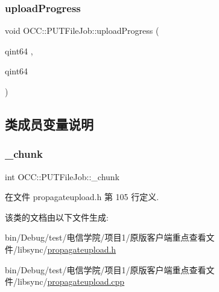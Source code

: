 \subsubsection{\texorpdfstring{upload\+Progress}{uploadProgress}}
{\footnotesize\ttfamily void O\+C\+C\+::\+P\+U\+T\+File\+Job\+::upload\+Progress (\begin{DoxyParamCaption}\item[{qint64}]{,  }\item[{qint64}]{ }\end{DoxyParamCaption})\hspace{0.3cm}{\ttfamily [signal]}}



\subsection{类成员变量说明}
\mbox{\label{class_o_c_c_1_1_p_u_t_file_job_aa10f6923befe5632249e181be64f33a7}} 
\subsubsection{\texorpdfstring{\+\_\+chunk}{\_chunk}}
{\footnotesize\ttfamily int O\+C\+C\+::\+P\+U\+T\+File\+Job\+::\+\_\+chunk}



在文件 propagateupload.\+h 第 105 行定义.



该类的文档由以下文件生成\+:\begin{DoxyCompactItemize}
\item 
bin/\+Debug/test/电信学院/项目1/原版客户端重点查看文件/libsync/\hyperlink{propagateupload_8h}{propagateupload.\+h}\item 
bin/\+Debug/test/电信学院/项目1/原版客户端重点查看文件/libsync/\hyperlink{propagateupload_8cpp}{propagateupload.\+cpp}\end{DoxyCompactItemize}
